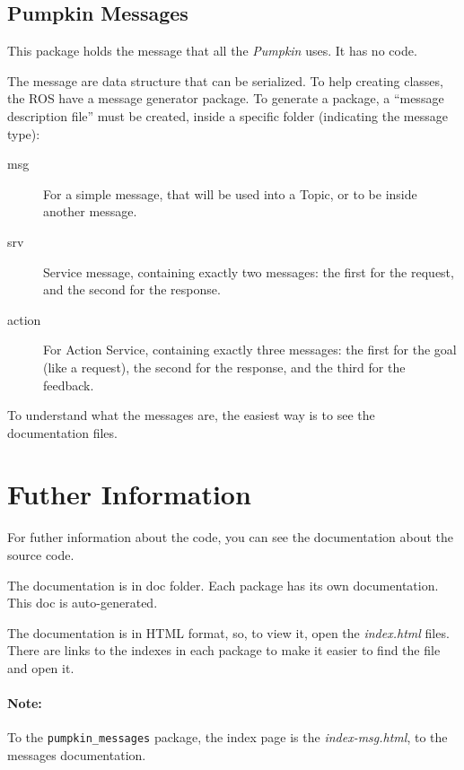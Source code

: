 \documentclass[oneside,a4paper,titlepage]{article}
\begin{document}
\subsection{Pumpkin Messages}

This package holds the message that all the \emph{Pumpkin} uses. It has no code.

The message are data structure that can be serialized. To help creating classes, the ROS have a message generator package. To generate a package, a ``message description file'' must be created, inside a specific folder (indicating the message type):

\begin{description}
	\item[msg] For a simple message, that will be used into a Topic, or to be inside another message.
	\item[srv] Service message, containing exactly two messages: the first for the request, and the second for the response.
	\item[action] For Action Service, containing exactly three messages: the first for the goal (like a request), the second for the response, and the third for the feedback.
\end{description}

To understand what the messages are, the easiest way is to see the documentation files.

\newpage
\section{Futher Information}

For futher information about the code, you can see the documentation about the source code.

The documentation is in doc folder. Each package has its own documentation. This doc is auto-generated.

The documentation is in HTML format, so, to view it, open the \emph{index.html} files. There are links to the indexes in each package to make it easier to find the file and open it.

\paragraph{Note: } To the \texttt{pumpkin\_messages} package, the index page is the \emph{index-msg.html}, to the messages documentation.
\end{document}
